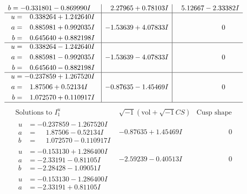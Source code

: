 \documentclass[1p]{elsarticle_modified}
\theoremstyle{definition}
\newcommand{\I}{\sqrt{-1}}
\begin{document}
$$\begin{array}{c|c|c}
\begin{aligned}
b &= -0.331801 - 0.869990 I\end{aligned}
 & \phantom{-}2.27965 + 0.78103 I & \phantom{-}5.12667 - 2.33382 I \\ \hline\begin{aligned}
u &= \phantom{-}0.338264 + 1.242640 I \\
a &= \phantom{-}0.885981 + 0.992035 I \\
b &= \phantom{-}0.645640 + 0.882198 I\end{aligned}
 & -1.53639 + 4.07833 I & \phantom{-0.000000 } 0 \\ \hline\begin{aligned}
u &= \phantom{-}0.338264 - 1.242640 I \\
a &= \phantom{-}0.885981 - 0.992035 I \\
b &= \phantom{-}0.645640 - 0.882198 I\end{aligned}
 & -1.53639 - 4.07833 I & \phantom{-0.000000 } 0 \\ \hline\begin{aligned}
u &= -0.237859 + 1.267520 I \\
a &= \phantom{-}1.87506 + 0.52134 I \\
b &= \phantom{-}1.072570 + 0.110917 I\end{aligned}
 & -0.87635 - 1.45469 I & \phantom{-0.000000 } 0\\
 \hline 
 \end{array}$$\newpage$$\begin{array}{c|c|c}  
\text{Solutions to }I^u_{1}& \I (\text{vol} + \sqrt{-1}CS) & \text{Cusp shape}\\
 \hline 
\begin{aligned}
u &= -0.237859 - 1.267520 I \\
a &= \phantom{-}1.87506 - 0.52134 I \\
b &= \phantom{-}1.072570 - 0.110917 I\end{aligned}
 & -0.87635 + 1.45469 I & \phantom{-0.000000 } 0 \\ \hline\begin{aligned}
u &= -0.153130 + 1.286400 I \\
a &= -2.33191 - 0.81105 I \\
b &= -2.28428 - 1.09051 I\end{aligned}
 & -2.59239 - 0.40513 I & \phantom{-0.000000 } 0 \\ \hline\begin{aligned}
u &= -0.153130 - 1.286400 I \\
a &= -2.33191 + 0.81105 I \\

\end{aligned}
\end{array}$$
\end{document}
